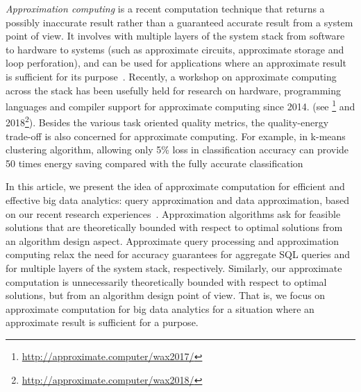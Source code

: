 \item[(3)] {\em Approximation computing} is a recent computation technique that returns a possibly inaccurate result rather than a guaranteed accurate result from a system point of view.  It involves with multiple layers of the system stack from software to hardware to systems (such as approximate circuits, approximate storage and loop perforation), and can be used for applications where an approximate result is sufficient for its purpose~\cite{AgrawalCGGNOPSS16,Mittal16b}. Recently, a workshop on approximate computing across the stack has been usefully held for research on hardware, programming languages and compiler support  for approximate computing  since 2014.  (see \footnote{\small  \url{http://approximate.computer/wax2017/}} and 2018\footnote{\small \url{http://approximate.computer/wax2018/}}). Besides the various task oriented quality metrics,  the quality-energy trade-off is also  concerned for approximate computing. For example, in k-means clustering algorithm, allowing only 5\% loss in classification accuracy can provide 50 times energy saving compared with the fully accurate classification~\cite{Mittal16b}
\ei

In this article, we present the idea of approximate computation for efficient and effective big data analytics: query approximation and data approximation, based on our recent research experiences~\cite{MaCHW12,ShuaiMaVLDB12,tods-MaCFHW14,LinMZWH17,MaHWLH17,MaFLWCH16,MaFLWCH17,HuAMH16,DuanAMHH16,DuanMAMH17,rankicde2018}.
Approximation algorithms ask for feasible solutions that are theoretically bounded with respect to optimal solutions from an algorithm design aspect.
Approximate query processing and approximation computing relax the need for accuracy guarantees for aggregate SQL queries and for multiple layers of the system stack, respectively. Similarly, our approximate computation is unnecessarily theoretically bounded with respect to optimal solutions, but from an algorithm design point of view. That is, we focus on approximate computation for big data analytics for a situation where an approximate result is sufficient for a purpose.





